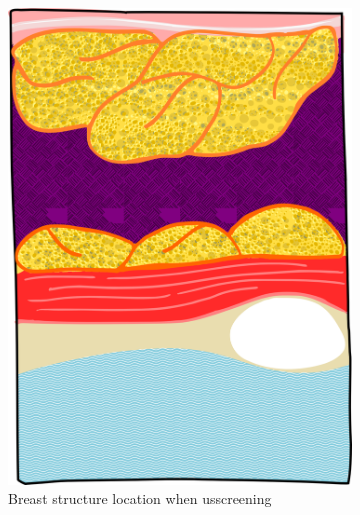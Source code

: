 \begin{figure}
\begin{subfigure}[b]{0.25\textwidth}
        \includegraphics[width=\textwidth]{slice}
        \caption[]%
        {{\small Breast structure location when \ac{us}screening}}
        \label{fig:lesions:slice}
    \end{subfigure}
    \hfill
    \begin{subfigure}[b]{0.4\textwidth}   
        \centering 

\end{subfigure}
\end{figure}

